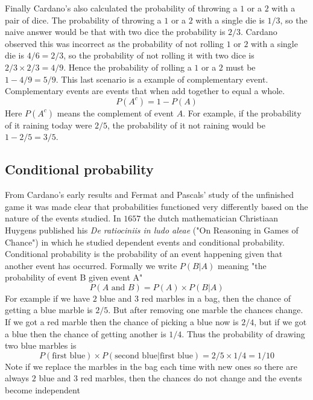 \myindent Finally Cardano’s also calculated the probability of throwing a $1$ or a $2$ with a pair of dice. The probability of throwing a $1$ or a $2$ with a single die is $1/3$, so the naive answer would be that with two dice the probability is $2/3$. Cardano observed this was incorrect as the probability of not rolling $1$ or $2$ with a single die is $4/6 = 2/3$, so the probability of not rolling it with two dice is $2/3 \times 2/3 = 4/9$. Hence the probability of rolling a $1$ or a $2$ must be $1 - 4/9 = 5/9$. This last scenario is a example of complementary event. Complementary events are events that when add together to equal a whole.
\begin{equation}\label{prob:complementary-event}
P(A^c) = 1 - P(A)
\end{equation}
Here $P(A^c)$ means the complement of event $A$. For example, if the probability of it raining today were $2/5$, the probability of it not raining would be $1 - 2/5 = 3/5$.

\subsection{Conditional probability}
From Cardano's early results and Fermat and Pascals' study of the unfinished game it was made clear that probabilities functioned very differently based on the nature of the events studied. In $1657$ the dutch mathematician Christiaan Huygens published his \textit{De ratiociniis in ludo aleae} ("On Reasoning in Games of Chance") in which he studied dependent events and conditional probability. Conditional probability is the probability of an event happening given that another event has occurred. Formally we write $P(B|A)$ meaning "the probability of event B given event A"
\begin{equation}\label{prob:conditional-event}
P(A \text{ and } B) = P(A) \times P(B|A)
\end{equation}
For example if we have $2$ blue and $3$ red marbles in a bag, then the chance of getting a blue marble is $2/5$. But after removing one marble the chances change. If we got a red marble then the chance of picking a blue now is $2/4$, but if we got a blue then the chance of getting another is $1/4$. Thus the probability of drawing two blue marbles is
\[
P(\text{first blue}) \times P(\text{second blue}|\text{first blue}) = 2/5 \times 1/4 = 1/10
\]
Note if we replace the marbles in the bag each time with new ones so there are always $2$ blue and $3$ red marbles, then the chances do not change and the events become independent

